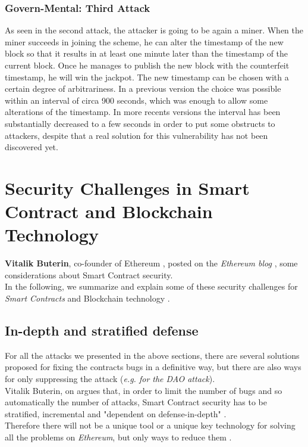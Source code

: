 \subsubsection{Govern-Mental: Third Attack}
As seen in the second attack, the attacker is going to be again a miner. When the miner succeeds in joining the scheme, he can alter the timestamp of the new block so that it results in at least one minute later than the timestamp of the current block. Once he manages to publish the new block with the counterfeit timestamp, he will win the jackpot.
The new timestamp can be chosen with a certain degree of arbitrariness\cite{paper2}. In a previous version the choice was possible within an interval of circa 900 seconds\cite{BlockProtocol}, which was enough to allow some alterations of the timestamp. In more recents versions the interval has been substantially decreased to a few seconds\cite{paper2} in order to put some obstructs to attackers, despite that a real solution for this vulnerability has not been discovered yet.
\section{Security Challenges in Smart Contract and Blockchain Technology}
\textbf{Vitalik Buterin}, co-founder of Ethereum \cite{vitalin}, posted on the \textit{Ethereum blog} \cite{challenge2}, some considerations about Smart Contract security.\\
In the following, we summarize and explain some of these security challenges for  \textit{Smart Contracts} and Blockchain technology \cite{challenge1}.
\subsection{In-depth and stratified defense}
For all the attacks we presented in the above sections, there are several solutions proposed for fixing the contracts bugs in a definitive way, but there are also ways for only suppressing the attack (\textit{e.g. for the DAO attack}). \\
Vitalik Buterin, on \cite{challenge2} argues that, in order to limit the number of bugs and so automatically the number of attacks, Smart Contract security has to be stratified, incremental and "dependent on defense-in-depth" \cite{challenge2}. \\
Therefore there will not be a unique tool or a unique key technology for solving all the problems on \textit{Ethereum}, but only ways to reduce them \cite{challenge2}.
